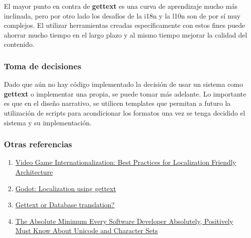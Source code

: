 El mayor punto en contra de \textbf{gettext} es una curva de aprendizaje mucho más inclinada, pero por otro lado los desafíos de la i18n y la l10n son de por sí muy complejos. El utilizar herramientas creadas específicamente con estos fines puede ahorrar mucho tiempo en el largo plazo y al mismo tiempo mejorar la calidad del contenido.

\subsubsection{Toma de decisiones}\label{i18n:decisiones-i18n}
Dado que aún no hay código implementado la decisión de usar un sistema como \textbf{gettext} o implementar una  propia, se puede tomar más adelante. Lo importante es que en el diseño narrativo, se utilicen templates que permitan a futuro la utilización de scripts para acondicionar los formatos una vez se tenga decidido el sistema y su implementación.

\subsubsection{Otras referencias}\label{i18n:otras-referencias}

\begin{enumerate}
\item \sloppy\href{https://daydigital.com/video-game-internationalization-best-practices}{Video Game Internationalization: Best Practices for Localization Friendly Architecture}

\item \href{https://docs.godotengine.org/en/latest/tutorials/i18n/localization_using_gettext.html}{Godot: Localization using gettext}

\item \href{https://stackoverflow.com/a/15343103/14377142}{Gettext or Database translation?}

\item \href{https://www.joelonsoftware.com/2003/10/08/the-absolute-minimum-every-software-developer-absolutely-positively-must-know-about-unicode-and-character-sets-no-excuses/}{The Absolute Minimum Every Software Developer Absolutely, Positively Must Know About Unicode and Character Sets}
\end{enumerate}